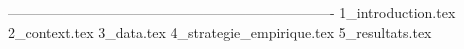 \documentclass[7pt]{article}
\begin{document}

\newpage 
\fancyhf{}
\renewcommand{\headrulewidth}{0pt}
\fancyfoot[R]{{{{\thepage}\hspace{-1cm}}}}
\pagestyle{fancy}
\thispagestyle{fancy}
\setcounter{page}{1}
----------------------------------------------------------------------%
{1_introduction.tex}   
{2_context.tex}   
{3_data.tex}   
{4_strategie_empirique.tex}   
{5_resultats.tex}   
\nocite{*}
\newpage
\printbibliography[title={Références}]
\end{document}
